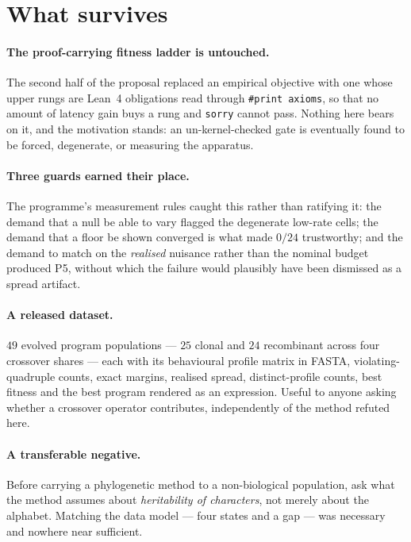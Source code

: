 \documentclass[11pt,a4paper]{article}
\theoremstyle{definition}
\theoremstyle{remark}
\begin{document}
\section{What survives}

\paragraph{The proof-carrying fitness ladder is untouched.} The second half of
the proposal replaced an empirical objective with one whose upper rungs are
Lean~4 obligations read through \texttt{\#print axioms}, so that no amount of
latency gain buys a rung and \texttt{sorry} cannot pass. Nothing here bears on
it, and the motivation stands: an un-kernel-checked gate is eventually found to
be forced, degenerate, or measuring the apparatus.

\paragraph{Three guards earned their place.} The programme's measurement rules
caught this rather than ratifying it: the demand that a null be able to vary
flagged the degenerate low-rate cells; the demand that a floor be shown converged
is what made $0/24$ trustworthy; and the demand to match on the \emph{realised}
nuisance rather than the nominal budget produced P5, without which the failure
would plausibly have been dismissed as a spread artifact.

\paragraph{A released dataset.} $49$ evolved program populations --- $25$ clonal
and $24$ recombinant across four crossover shares --- each with its behavioural
profile matrix in FASTA, violating-quadruple counts, exact margins, realised
spread, distinct-profile counts, best fitness and the best program rendered as an
expression. Useful to anyone asking whether a crossover operator contributes,
independently of the method refuted here.

\paragraph{A transferable negative.} Before carrying a phylogenetic method to a
non-biological population, ask what the method assumes about \emph{heritability
of characters}, not merely about the alphabet. Matching the data model --- four
states and a gap --- was necessary and nowhere near sufficient.
\end{document}
